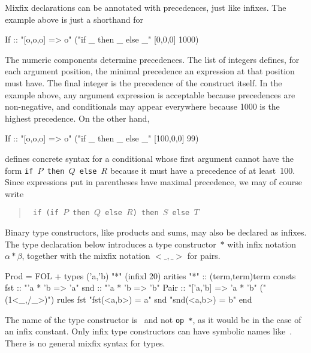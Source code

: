 Mixfix declarations can be annotated with precedences, just like
infixes.  The example above is just a shorthand for
\begin{ttbox}
        If :: "[o,o,o] => o"       ("if _ then _ else _" [0,0,0] 1000)
\end{ttbox}
The numeric components determine precedences.  The list of integers
defines, for each argument position, the minimal precedence an expression
at that position must have.  The final integer is the precedence of the
construct itself.  In the example above, any argument expression is
acceptable because precedences are non-negative, and conditionals may
appear everywhere because 1000 is the highest precedence.  On the other
hand,
\begin{ttbox}
        If :: "[o,o,o] => o"       ("if _ then _ else _" [100,0,0] 99)
\end{ttbox}
defines concrete syntax for a conditional whose first argument cannot have
the form {\tt if~$P$ then~$Q$ else~$R$} because it must have a precedence
of at least~100.  Since expressions put in parentheses have maximal
precedence, we may of course write
\begin{quote}\tt
if (if $P$ then $Q$ else $R$) then $S$ else $T$
\end{quote}

Binary type constructors, like products and sums, may also be declared as
infixes.  The type declaration below introduces a type constructor~$*$ with
infix notation $\alpha*\beta$, together with the mixfix notation
${<}\_,\_{>}$ for pairs.  
\begin{ttbox}
Prod = FOL +
types   ('a,'b) "*"                           (infixl 20)
arities "*"     :: (term,term)term
consts  fst     :: "'a * 'b => 'a"
        snd     :: "'a * 'b => 'b"
        Pair    :: "['a,'b] => 'a * 'b"       ("(1<_,/_>)")
rules   fst     "fst(<a,b>) = a"
        snd     "snd(<a,b>) = b"
end
\end{ttbox}

\begin{warn}
The name of the type constructor is~{\tt *} and not {\tt op~*}, as it would
be in the case of an infix constant.  Only infix type constructors can have
symbolic names like~{\tt *}.  There is no general mixfix syntax for types.
\end{warn}


